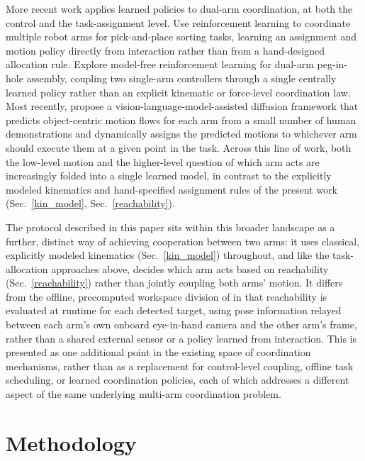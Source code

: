 \documentclass[letterpaper, 10 pt, conference]{ieeeconf}  %
\begin{document}
More recent work applies learned policies to dual-arm coordination, at both the control and the task-assignment level. \cite{jermann2024efficient} Use reinforcement learning to coordinate multiple robot arms for pick-and-place sorting tasks, learning an assignment and motion policy directly from interaction rather than from a hand-designed allocation rule. \cite{10.3389/frobt.2022.830007} Explore model-free reinforcement learning for dual-arm peg-in-hole assembly, coupling two single-arm controllers through a single centrally learned policy rather than an explicit kinematic or force-level coordination law. Most recently, \cite{11223144} propose a vision-language-model-assisted diffusion framework that predicts object-centric motion flows for each arm from a small number of human demonstrations and dynamically assigns the predicted motions to whichever arm should execute them at a given point in the task. Across this line of work, both the low-level motion and the higher-level question of which arm acts are increasingly folded into a single learned model, in contrast to the explicitly modeled kinematics and hand-specified assignment rules of the present work (Sec.~\ref{kin_model}, Sec.~\ref{reachability}).

The protocol described in this paper sits within this broader landscape as a further, distinct way of achieving cooperation between two arms: it uses classical, explicitly modeled kinematics (Sec.~\ref{kin_model}) throughout, and like the task-allocation approaches above, decides which arm acts based on reachability (Sec.~\ref{reachability}) rather than jointly coupling both arms' motion. It differs from the offline, precomputed workspace division of \cite{zacharias2007capturing} in that reachability is evaluated at runtime for each detected target, using pose information relayed between each arm's own onboard eye-in-hand camera and the other arm's frame, rather than a shared external sensor or a policy learned from interaction. This is presented as one additional point in the existing space of coordination mechanisms, rather than as a replacement for control-level coupling, offline task scheduling, or learned coordination policies, each of which addresses a different aspect of the same underlying multi-arm coordination problem.

\section{Methodology}
\end{document}
